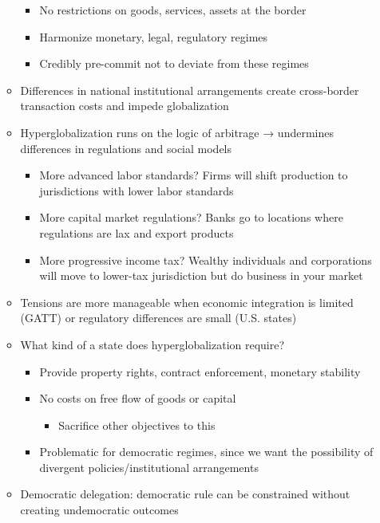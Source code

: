 \begin{itemize}
\begin{itemize}
    \begin{itemize}
    \tightlist
    \item
      No restrictions on goods, services, assets at the border
    \item
      Harmonize monetary, legal, regulatory regimes
    \item
      Credibly pre-commit not to deviate from these regimes
    \end{itemize}
  \item
    Differences in national institutional arrangements create
    cross-border transaction costs and impede globalization
  \item
    Hyperglobalization runs on the logic of arbitrage → undermines
    differences in regulations and social models

    \begin{itemize}
    \tightlist
    \item
      More advanced labor standards? Firms will shift production to
      jurisdictions with lower labor standards
    \item
      More capital market regulations? Banks go to locations where
      regulations are lax and export products
    \item
      More progressive income tax? Wealthy individuals and corporations
      will move to lower-tax jurisdiction but do business in your market
    \end{itemize}
  \item
    Tensions are more manageable when economic integration is limited
    (GATT) or regulatory differences are small (U.S. states)
  \item
    What kind of a state does hyperglobalization require?

    \begin{itemize}
    \tightlist
    \item
      Provide property rights, contract enforcement, monetary stability
    \item
      No costs on free flow of goods or capital

      \begin{itemize}
      \tightlist
      \item
        Sacrifice other objectives to this
      \end{itemize}
    \item
      Problematic for democratic regimes, since we want the possibility
      of divergent policies/institutional arrangements
    \end{itemize}
  \item
    Democratic delegation: democratic rule can be constrained without
    creating undemocratic outcomes


\end{itemize}
\end{itemize}
